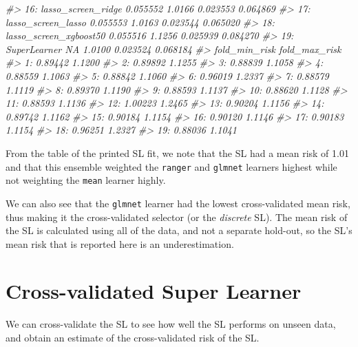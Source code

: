 \documentclass[12pt, krantz2,]{book}
\newenvironment{Shaded}{\begin{snugshade}}{\end{snugshade}}
\newcommand{\CommentTok}[1]{\textcolor[rgb]{0.56,0.35,0.01}{\textit{#1}}}
\theoremstyle{definition}
\theoremstyle{definition}
\theoremstyle{definition}
\newcommand{\1}{\mathbbm{1}}
\begin{document}
\begin{Shaded}
\begin{Highlighting}[]
\CommentTok{#> 16:            lasso_screen_ridge     0.055552 1.0166 0.023553 0.064869}
\CommentTok{#> 17:            lasso_screen_lasso     0.055553 1.0163 0.023544 0.065020}
\CommentTok{#> 18:        lasso_screen_xgboost50     0.055516 1.1256 0.025939 0.084270}
\CommentTok{#> 19:                  SuperLearner           NA 1.0100 0.023524 0.068184}
\CommentTok{#>     fold_min_risk fold_max_risk}
\CommentTok{#>  1:       0.89442        1.1200}
\CommentTok{#>  2:       0.89892        1.1255}
\CommentTok{#>  3:       0.88839        1.1058}
\CommentTok{#>  4:       0.88559        1.1063}
\CommentTok{#>  5:       0.88842        1.1060}
\CommentTok{#>  6:       0.96019        1.2337}
\CommentTok{#>  7:       0.88579        1.1119}
\CommentTok{#>  8:       0.89370        1.1190}
\CommentTok{#>  9:       0.88593        1.1137}
\CommentTok{#> 10:       0.88620        1.1128}
\CommentTok{#> 11:       0.88593        1.1136}
\CommentTok{#> 12:       1.00223        1.2465}
\CommentTok{#> 13:       0.90204        1.1156}
\CommentTok{#> 14:       0.89742        1.1162}
\CommentTok{#> 15:       0.90184        1.1154}
\CommentTok{#> 16:       0.90120        1.1146}
\CommentTok{#> 17:       0.90183        1.1154}
\CommentTok{#> 18:       0.96251        1.2327}
\CommentTok{#> 19:       0.88036        1.1041}
\end{Highlighting}
\end{Shaded}

From the table of the printed SL fit, we note that the SL had a mean risk of
1.01 and that
this ensemble weighted the \texttt{ranger} and \texttt{glmnet} learners highest while not
weighting the \texttt{mean} learner highly.

We can also see that the \texttt{glmnet} learner had the lowest cross-validated mean
risk, thus making it the cross-validated selector (or the \emph{discrete} SL). The
mean risk of the SL is calculated using all of the data, and not a separate
hold-out, so the SL's mean risk that is reported here is an underestimation.

\hypertarget{cross-validated-super-learner}{%
\section*{Cross-validated Super Learner}\label{cross-validated-super-learner}}


We can cross-validate the SL to see how well the SL performs on unseen data,
and obtain an estimate of the cross-validated risk of the SL.
\end{document}
